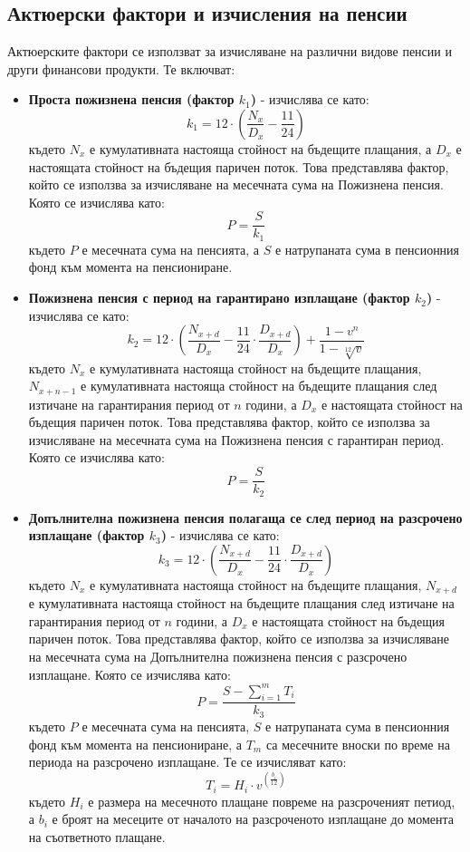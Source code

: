 \documentclass[a4paper,12pt]{article}
\begin{document}
\subsection{Актюерски фактори и изчисления на пенсии}
Актюерските фактори се използват за изчисляване на различни видове пенсии и други финансови продукти. Те включват:
\begin{itemize}
        \item \textbf{Проста пожизнена пенсия (фактор $k_1$)} - изчислява се като:
              \[k_1 = 12\cdot\left(\frac{N_{x}}{D_{x}}-\frac{11}{24}\right)\]
              където $N_x$ е кумулативната настояща стойност на бъдещите плащания, а $D_x$ е настоящата стойност на бъдещия паричен поток. Това представлява фактор, който се използва за изчисляване на месечната сума на Пожизнена пенсия. Която се изчислява като:
              \[P = \frac{S}{k_1}\]
              където $P$ е месечната сума на пенсията, а $S$ е натрупаната сума в пенсионния фонд към момента на пенсиониране.
        \item \textbf{Пожизнена пенсия с  период на гарантирано изплащане (фактор $k_2$)} - изчислява се като:
              \[k_2 = 12\cdot\left(\frac{N_{x+d}}{D_x} - \frac{11}{24}\cdot \frac{D_{x+d}}{D_{x}}\right)+\frac{1-v^n}{1-\sqrt[12]{v}}\]
              където $N_x$ е кумулативната настояща стойност на бъдещите плащания, $N_{x+n-1}$ е кумулативната настояща стойност на бъдещите плащания след изтичане на гарантирания период от $n$ години, а $D_x$ е настоящата стойност на бъдещия паричен поток. Това представлява фактор, който се използва за изчисляване на месечната сума на Пожизнена пенсия с гарантиран период. Която се изчислява като:
              \[P = \frac{S}{k_2}\]
        \item \textbf{Допълнителна пожизнена пенсия полагаща се след период на разсрочено изплащане (фактор $k_3$)} - изчислява се като:
              \[k_3 = 12\cdot\left(\frac{N_{x+d}}{D_{x}} - \frac{11}{24}\cdot\frac{
                              D_{x+d}}{D_{x}}\right)\]
              където $N_x$ е кумулативната настояща стойност на бъдещите плащания, $N_{x+d}$ е кумулативната настояща стойност на бъдещите плащания след изтичане на гарантирания период от $n$ години, а $D_x$ е настоящата стойност на бъдещия паричен поток. Това представлява фактор, който се използва за изчисляване на месечната сума на Допълнителна пожизнена пенсия с разсрочено изплащане. Която се изчислява като:
              \[P = \frac{S-\sum_{i=1}^{m}T_i}{k_3}\]
              където $P$ е месечната сума на пенсията, $S$ е натрупаната сума в пенсионния фонд към момента на пенсиониране, а $T_m$ са месечните вноски по време на периода на разсрочено изплащане. Те се изчисляват като:
              \[T_i= H_i \cdot v^{(\frac{b_i}{12})}\]
              където $H_i$ е размера на месечното плащане повреме на разсроченият петиод, а $b_i$ е броят на месеците от началото на разсроченото изплащане до момента на съответното плащане.
\end{itemize}
\newpage
\end{document}
